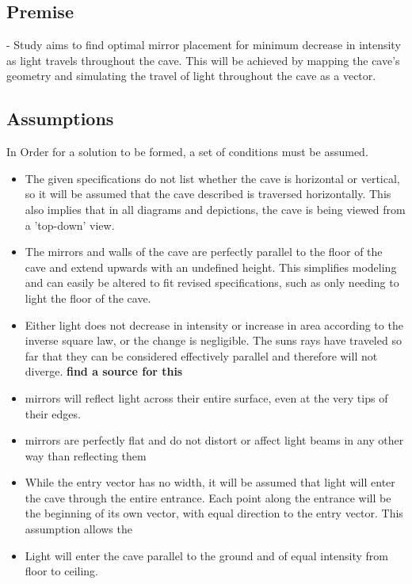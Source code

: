 \documentclass[11pt, letterpaper]{article}
\begin{document}
\subsection{Premise}
- Study aims to find optimal mirror placement for minimum decrease in intensity as light travels throughout the cave. This will be achieved by mapping the cave's geometry and simulating the travel of light throughout the cave as a vector. 




\subsection{Assumptions} 
\par
In Order for a solution to be formed, a set of conditions must be assumed.
\begin{itemize}

	\item The given specifications do not list whether the cave is horizontal or vertical, so it will be assumed that the cave described is traversed horizontally. This also implies that in all diagrams and depictions, the cave is being viewed from a 'top-down' view.
	
	\item The mirrors and walls of the cave are perfectly parallel to the floor of the cave and extend upwards with an undefined height. This simplifies modeling and can easily be altered to fit revised specifications, such as only needing to light the floor of the cave.
	

	\item Either light does not decrease in intensity or increase in area according to the inverse square law, or the change is negligible. The suns rays have traveled so far that they can be considered effectively parallel and therefore will not diverge. 
	\textbf{find a source for this}
		
	\item mirrors will reflect light across their entire surface, even at the very tips of their edges. 
	
	\item mirrors are perfectly flat and do not distort or affect light beams in any other way than reflecting them
	
	\item While the entry vector has no width, it will be assumed that light will enter the cave through the entire entrance. Each point along the entrance will be the beginning of its own vector, with equal direction to the entry vector. This assumption allows the 
	
		
	\item Light will enter the cave parallel to the ground and of equal intensity from floor to ceiling.
	

\end{itemize}
\end{document}
